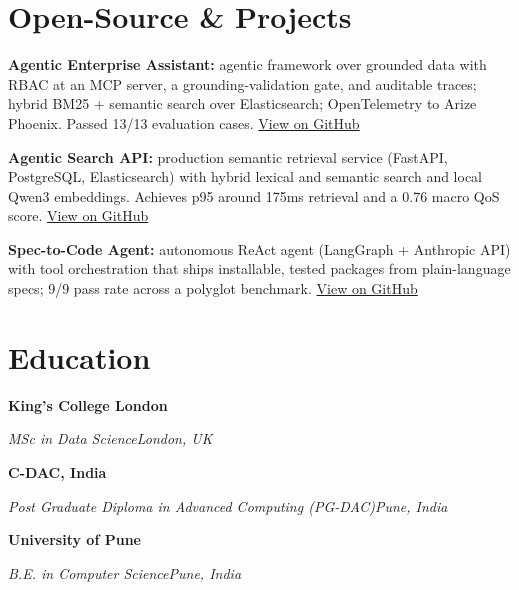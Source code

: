 \documentclass[10pt,a4paper]{article}
\newcommand{\entry}[4]{%
  {\color{company}\bfseries #1}\hfill {\color{muted}#2}\par
  \vspace{1pt}
  {\itshape #3}\hfill {\color{muted}\itshape #4}\par
  \vspace{3pt}%
}
\begin{document}
\section{Open-Source \& Projects}
\begin{tight}
  \item \textbf{Agentic Enterprise Assistant:} agentic framework over grounded data with RBAC at an MCP server, a grounding-validation gate, and auditable traces; hybrid BM25 + semantic search over Elasticsearch; OpenTelemetry to Arize Phoenix. Passed 13/13 evaluation cases. \href{https://github.com/abhijeetscode/Agentic-Enterprise-Assistant}{View on GitHub}
  \item \textbf{Agentic Search API:} production semantic retrieval service (FastAPI, PostgreSQL, Elasticsearch) with hybrid lexical and semantic search and local Qwen3 embeddings. Achieves p95 around 175ms retrieval and a 0.76 macro QoS score. \href{https://github.com/abhijeetscode/search-agent}{View on GitHub}
  \item \textbf{Spec-to-Code Agent:} autonomous ReAct agent (LangGraph + Anthropic API) with tool orchestration that ships installable, tested packages from plain-language specs; 9/9 pass rate across a polyglot benchmark. \href{https://github.com/abhijeetscode/Spec-to-Code-Agent}{View on GitHub}
\end{tight}

\section{Education}
\entry{King's College London}{}{MSc in Data Science}{London, UK}
\vspace{-3pt}
\entry{C-DAC, India}{}{Post Graduate Diploma in Advanced Computing (PG-DAC)}{Pune, India}
\vspace{-3pt}
\entry{University of Pune}{}{B.E. in Computer Science}{Pune, India}
\end{document}
